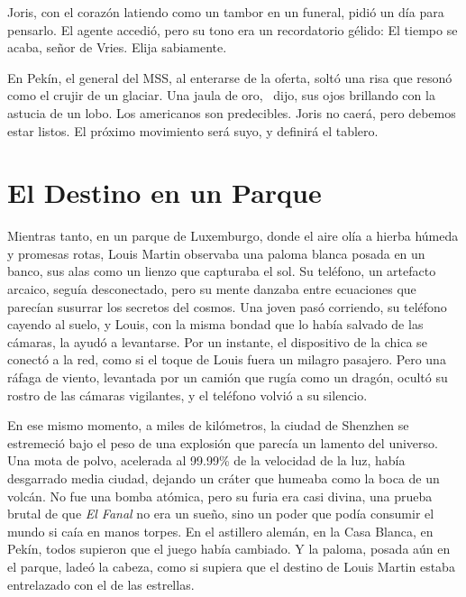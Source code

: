 \documentclass{book}
\begin{document}
Joris, con el corazón latiendo como un tambor en un funeral, pidió un día para pensarlo. El agente accedió, pero su tono era un recordatorio gélido: \glqq El tiempo se acaba, señor de Vries. Elija sabiamente.\grqq

En Pekín, el general del MSS, al enterarse de la oferta, soltó una risa que resonó como el crujir de un glaciar. \glqq Una jaula de oro,\grqq~ dijo, sus ojos brillando con la astucia de un lobo. \glqq Los americanos son predecibles. Joris no caerá, pero debemos estar listos. El próximo movimiento será suyo, y definirá el tablero.\grqq

\section{El Destino en un Parque}

Mientras tanto, en un parque de Luxemburgo, donde el aire olía a hierba húmeda y promesas rotas, Louis Martin observaba una paloma blanca posada en un banco, sus alas como un lienzo que capturaba el sol. Su teléfono, un artefacto arcaico, seguía desconectado, pero su mente danzaba entre ecuaciones que parecían susurrar los secretos del cosmos. Una joven pasó corriendo, su teléfono cayendo al suelo, y Louis, con la misma bondad que lo había salvado de las cámaras, la ayudó a levantarse. Por un instante, el dispositivo de la chica se conectó a la red, como si el toque de Louis fuera un milagro pasajero. Pero una ráfaga de viento, levantada por un camión que rugía como un dragón, ocultó su rostro de las cámaras vigilantes, y el teléfono volvió a su silencio.

En ese mismo momento, a miles de kilómetros, la ciudad de Shenzhen se estremeció bajo el peso de una explosión que parecía un lamento del universo. Una mota de polvo, acelerada al 99.99\% de la velocidad de la luz, había desgarrado media ciudad, dejando un cráter que humeaba como la boca de un volcán. No fue una bomba atómica, pero su furia era casi divina, una prueba brutal de que \emph{El Fanal} no era un sueño, sino un poder que podía consumir el mundo si caía en manos torpes. En el astillero alemán, en la Casa Blanca, en Pekín, todos supieron que el juego había cambiado. Y la paloma, posada aún en el parque, ladeó la cabeza, como si supiera que el destino de Louis Martin estaba entrelazado con el de las estrellas.
\end{document}
